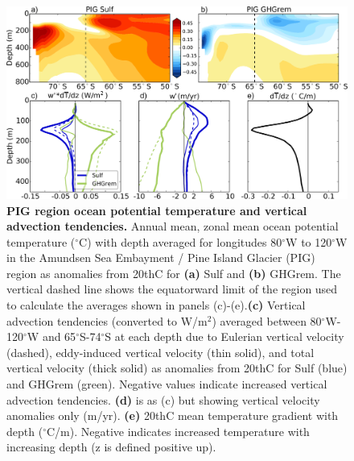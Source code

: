 \documentclass{nature}
\begin{document}
\begin{figure}%
 \noindent\includegraphics[width=35pc]{figures/TEMPanomvertheat_justPIG.pdf}
\caption{\textbf{PIG region ocean potential temperature and vertical advection tendencies.} Annual mean, zonal mean ocean potential temperature ($^\circ$C) with depth averaged for longitudes 80$^\circ$W to 120$^\circ$W in the Amundsen Sea Embayment / Pine Island Glacier (PIG) region as anomalies from 20thC for \textbf{(a)} Sulf and \textbf{(b)} GHGrem. The vertical dashed line shows the equatorward limit of the region used to calculate the averages shown in panels (c)-(e).\textbf{(c)} Vertical advection tendencies (converted to W/m$^2$) averaged between 80$^\circ$W-120$^\circ$W and 65$^\circ$S-74$^\circ$S at each depth due to Eulerian vertical velocity (dashed), eddy-induced vertical velocity (thin solid), and total vertical velocity (thick solid) as anomalies from 20thC for Sulf (blue) and GHGrem (green). Negative values indicate increased vertical advection tendencies. \textbf{(d)} is as (c) but showing vertical velocity anomalies only (m/yr). \textbf{(e)} 20thC mean temperature gradient with depth ($^\circ$C/m). Negative indicates increased temperature with increasing depth (z is defined positive up).}
\label{fig:pigtemp}
\end{figure}




%

\end{document}
